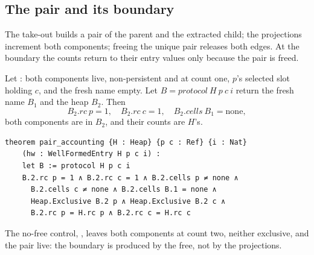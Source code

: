 \documentclass[a4paper,UKenglish,cleveref]{lipics-v2021}
\begin{document}
\subsection{The pair and its boundary}
The take-out builds a pair of the parent and the extracted child; the
projections increment both components; freeing the unique pair releases both
edges. At the boundary the counts return to their entry values only because the
pair is freed.
\begin{theorem}\label{thm:pair}
Let : both components live, non-persistent and at
count one, $p$'s selected slot holding $c$, and the fresh name empty. Let
$B = \mathit{protocol}\ H\ p\ c\ i$ return the fresh name $B_1$ and the heap
$B_2$. Then
\[
B_2.\mathit{rc}\ p = 1,\quad B_2.\mathit{rc}\ c = 1,\quad
B_2.\mathit{cells}\ B_1 = \mathrm{none},
\]
both components are  in $B_2$, and their counts are $H$'s.
\end{theorem}
\begin{lstlisting}
theorem pair_accounting {H : Heap} {p c : Ref} {i : Nat}
    (hw : WellFormedEntry H p c i) :
    let B := protocol H p c i
    B.2.rc p = 1 ∧ B.2.rc c = 1 ∧ B.2.cells p ≠ none ∧
      B.2.cells c ≠ none ∧ B.2.cells B.1 = none ∧
      Heap.Exclusive B.2 p ∧ Heap.Exclusive B.2 c ∧
      B.2.rc p = H.rc p ∧ B.2.rc c = H.rc c
\end{lstlisting}
The no-free control, , leaves both
components at count two, neither exclusive, and the pair live: the boundary is
produced by the free, not by the projections.
\end{document}
